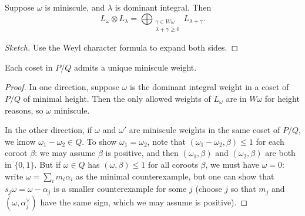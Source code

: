 \documentclass{article}
\begin{document}
\begin{proposition}
	Suppose $\omega$ is miniscule, and $\lambda$ is dominant integral. Then
	\[L_\omega\otimes L_\lambda=\bigoplus_{\substack{\gamma\in W\omega\\\lambda+\gamma\ge0}}L_{\lambda+\gamma}.\]
\end{proposition}
\begin{proof}[Sketch]
	Use the Weyl character formula to expand both sides.
\end{proof}
\begin{proposition}
	Each coset in $P/Q$ admits a unique miniscule weight.
\end{proposition}
\begin{proof}
	In one direction, suppose $\omega$ is the dominant integral weight in a coset of $P/Q$ of minimal height. Then the only allowed weights of $L_\omega$ are in $W\omega$ for height reasons, so $\omega$ miniscule.

	In the other direction, if $\omega$ and $\omega'$ are miniscule weights in the same coset of $P/Q$, we know $\omega_1-\omega_2\in Q$. To show $\omega_1=\omega_2$, note that $(\omega_1-\omega_2,\beta)\le1$ for each coroot $\beta$: we may assume $\beta$ is positive, and then $(\omega_1,\beta)$ and $(\omega_2,\beta)$ are both in $\{0,1\}$. But if $\omega\in Q$ has $(\omega,\beta)\le1$ for all coroots $\beta$, we must have $\omega=0$: write $\omega=\sum_im_i\alpha_i$ as the minimal counterexample, but one can show that $s_j\omega=\omega-\alpha_j$ is a smaller counterexample for some $j$ (choose $j$ so that $m_j$ and $(\omega,\alpha_j^\lor)$ have the same sign, which we may assume is positive).
\end{proof}
\end{document}
